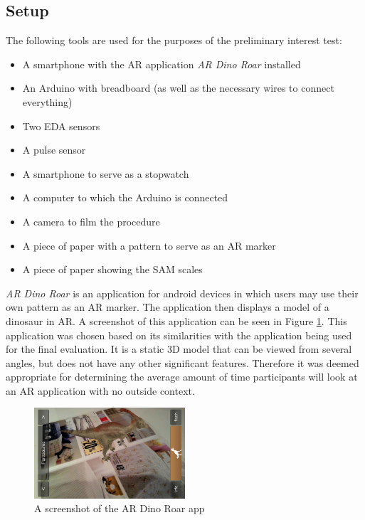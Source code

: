 \subsection{Setup}
The following tools are used for the purposes of the preliminary interest test:

\begin{itemize}
    \item A smartphone with the AR application \textit{AR Dino Roar} installed
    \item An Arduino with breadboard (as well as the necessary wires to connect everything)
    \item Two EDA sensors
    \item A pulse sensor
    \item A smartphone to serve as a stopwatch
    \item A computer to which the Arduino is connected
    \item A camera to film the procedure
    \item A piece of paper with a pattern to serve as an AR marker
    \item A piece of paper showing the SAM scales
\end{itemize}

\textit{AR Dino Roar} is an application for android devices in which users may use their own pattern as an AR marker. The application then displays a model of a dinosaur in AR. A screenshot of this application can be seen in Figure \ref{fig:dino}. This application was chosen based on its similarities with the application being used for the final evaluation. It is a static 3D model that can be viewed from several angles, but does not have any other significant features. Therefore it was deemed appropriate for determining the average amount of time participants will look at an AR application with no outside context. 

\begin{figure}[h!]
	\centering
    \includegraphics[width=0.5\textwidth]{figures/AR_dino.png}
    \caption{A screenshot of the AR Dino Roar app \cite{ARDino}}\label{fig:dino}
\end{figure}

